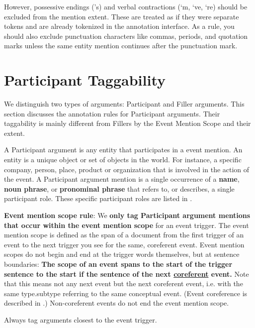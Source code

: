 However, possessive endings ('s) and verbal contractions (‘m, ‘ve, ‘re) should be excluded from the mention extent.
These are treated as if they were separate tokens and are already tokenized in the annotation interface.
As a rule, you should also exclude punctuation characters like commas, periods, and quotation marks unless the same entity mention continues after the punctuation mark.

\section{Participant Taggability}

We distinguish two types of arguments: Participant and Filler arguments.
This section discusses the annotation rules for Participant arguments.
Their taggability is mainly different from Fillers by the Event Mention Scope and their extent.

A Participant argument is any entity that participates in a  event mention.
An entity is a unique object or set of objects in the world.
For instance, a specific company, person, place, product or organization that is involved in the action of the event. 
A Participant argument mention is a single occurrence of a \textbf{name}, \textbf{noun phrase}, or \textbf{pronominal phrase} that refers to, or describes, a single participant role.
These specific participant roles are listed in .

\textbf{Event mention scope rule}:
We \textbf{only tag Participant argument mentions that occur within the event mention scope} for an event trigger.
The event mention scope is defined as the span of a document from the first trigger of an event to the next trigger you see for the same, coreferent event.
Event mention scopes do not begin and end at the trigger words themselves, but at sentence boundaries:
\textbf{The scope of an event spans to the start of the trigger sentence to the start if the sentence of the next \underline{coreferent} event.}
Note that this means not any next event but the next coreferent event, i.e. with the same type.subtype referring to the same conceptual event.
(Event coreference is described in .)
Non-coreferent events do not end the event mention scope.

Always tag arguments closest to the event trigger.

